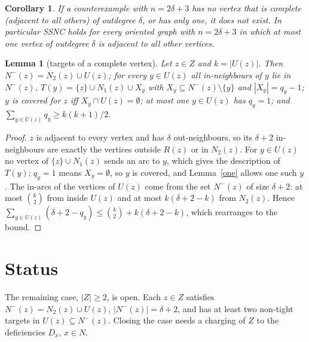 \documentclass[11pt]{article}
\newtheorem{lemma}[theorem]{Lemma}
\newtheorem{corollary}[theorem]{Corollary}
\theoremstyle{definition}
\begin{document}
\begin{corollary}
If a counterexample with $n=2\delta+3$ has no vertex that is complete (adjacent to all others) of outdegree $\delta$,
or has only one, it does not exist. In particular SSNC holds for every oriented graph with $n=2\delta+3$ in which at
most one vertex of outdegree $\delta$ is adjacent to all other vertices.
\end{corollary}

\begin{lemma}[targets of a complete vertex]\label{zt}
Let $z\in Z$ and $k=|U(z)|$. Then $N^-(z)=N_2(z)\cup U(z)$; for every $y\in U(z)$ all in-neighbours of $y$ lie in
$N^-(z)$, $T(y)=\{z\}\cup N_1(z)\cup X_y$ with $X_y\subseteq N^-(z)\setminus\{y\}$ and $|X_y|=q_y-1$; $y$ is covered
for $z$ iff $X_y\cap U(z)=\emptyset$; at most one $y\in U(z)$ has $q_y=1$; and
$\sum_{y\in U(z)}q_y\ge k(k+1)/2$.
\end{lemma}
\begin{proof}
$z$ is adjacent to every vertex and has $\delta$ out-neighbours, so its $\delta+2$ in-neighbours are exactly the vertices
outside $R(z)$ or in $N_2(z)$. For $y\in U(z)$ no vertex of $\{z\}\cup N_1(z)$ sends an arc to $y$, which gives the
description of $T(y)$; $q_y=1$ means $X_y=\emptyset$, so $y$ is covered, and Lemma~\ref{one} allows one such $y$. The
in-arcs of the vertices of $U(z)$ come from the set $N^-(z)$ of size $\delta+2$: at most $\binom k2$ from inside $U(z)$
and at most $k(\delta+2-k)$ from $N_2(z)$. Hence $\sum_{y\in U(z)}(\delta+2-q_y)\le\binom k2+k(\delta+2-k)$, which
rearranges to the bound.
\end{proof}

\section*{Status}
The remaining case, $|Z|\ge 2$, is open. Each $z\in Z$ satisfies $N^-(z)=N_2(z)\cup U(z)$, $|N^-(z)|=\delta+2$, and has
at least two non-tight targets in $U(z)\subseteq N^-(z)$. Closing the case needs a charging of $Z$ to the deficiencies
$D_x$, $x\in N$.
\end{document}
